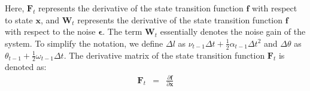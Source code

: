 \documentclass[12pt, a4paper]{article}
\begin{document}
Here, $\bm{F}_{t}$ represents the derivative of the state transition function $\bm{f}$ with respect to state $\bm{x}$, and $\bm{W}_{t}$ represents the derivative of the state transition function $\bm{f}$ with respect to the noise $\bm{\epsilon}$. The term $\bm{W}_{t}$ essentially denotes the noise gain of the system. To simplify the notation, we define $\Delta l$ as $\nu_{t-1}\Delta t + \frac{1}{2}\alpha_{t-1}\Delta t^2$ and $\Delta\theta$ as $\theta_{t-1} + \frac{1}{2}\omega_{t-1}\Delta t$. The derivative matrix of the state transition function $\bm{F}_{t}$ is denoted as:
\begin{eqnarray*}
  \bm{F}_{t} & = & \frac{\partial\bm{f}}{\partial\bm{x}}\\

\end{eqnarray*}
\end{document}
